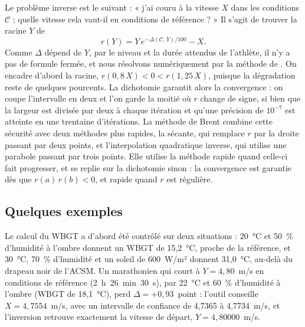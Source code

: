 \documentclass[11pt,a4paper]{article}
\begin{document}
Le problème inverse est le suivant : « j'ai couru à la vitesse $X$ dans les conditions $\mathcal{C}$ ; quelle vitesse
cela vaut-il en conditions de référence ? » Il s'agit de trouver la racine $Y$ de
\[
r(Y) = Y\,e^{-\Delta(\mathcal{C};\,Y)/100} - X .
\]
Comme $\Delta$ dépend de $Y$, par le niveau et la durée attendus de l'athlète, il n'y a pas de formule fermée, et nous
résolvons numériquement par la méthode de \citet{brent1973}. On encadre d'abord la racine, $r(0{,}8\,X) < 0 <
r(1{,}25\,X)$, puisque la dégradation reste de quelques pourcents. La dichotomie garantit alors la convergence : on
coupe l'intervalle en deux et l'on garde la moitié où $r$ change de signe, si bien que la largeur est divisée par deux
à chaque itération et qu'une précision de $10^{-7}$ est atteinte en une trentaine d'itérations. La méthode de Brent
combine cette sécurité avec deux méthodes plus rapides, la sécante, qui remplace $r$ par la droite passant par deux
points, et l'interpolation quadratique inverse, qui utilise une parabole passant par trois points. Elle utilise la
méthode rapide quand celle-ci fait progresser, et se replie sur la dichotomie sinon : la convergence est garantie dès
que $r(a)\,r(b) < 0$, et rapide quand $r$ est régulière.

\subsection{Quelques exemples}\label{sec:exemples}

Le calcul du WBGT a d'abord été contrôlé sur deux situations : 20~°C et 50~\% d'humidité à l'ombre donnent un WBGT de
15,2~°C, proche de la référence, et 30~°C, 70~\% d'humidité et un soleil de 600~W/m² donnent 31,0~°C, au-delà du
drapeau noir de l'ACSM. Un marathonien qui court à $Y = 4{,}80$~m/s en conditions de référence (2~h~26~min~30~s), par
22~°C et 60~\% d'humidité à l'ombre (WBGT de 18,1~°C), perd $\Delta = +0{,}93$~point : l'outil conseille
$X = 4{,}7554$~m/s, avec un intervalle de confiance de 4,7365 à 4,7734~m/s, et l'inversion retrouve exactement la
vitesse de départ, $Y = 4{,}80000$~m/s.
\end{document}

